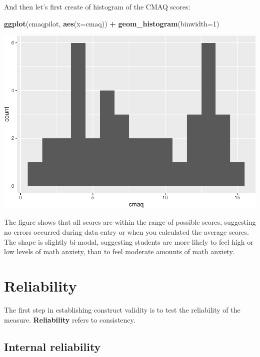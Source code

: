 \documentclass[
]{book}
\newenvironment{Shaded}{\begin{snugshade}}{\end{snugshade}}
\newcommand{\DataTypeTok}[1]{\textcolor[rgb]{0.13,0.29,0.53}{#1}}
\newcommand{\DecValTok}[1]{\textcolor[rgb]{0.00,0.00,0.81}{#1}}
\newcommand{\KeywordTok}[1]{\textcolor[rgb]{0.13,0.29,0.53}{\textbf{#1}}}
\newcommand{\NormalTok}[1]{#1}
\newcommand{\OperatorTok}[1]{\textcolor[rgb]{0.81,0.36,0.00}{\textbf{#1}}}
\newcommand{\StringTok}[1]{\textcolor[rgb]{0.31,0.60,0.02}{#1}}
\begin{document}
And then let's first create of histogram of the CMAQ scores:

\begin{Shaded}
\begin{Highlighting}[]
\KeywordTok{ggplot}\NormalTok{(cmaqpilot, }\KeywordTok{aes}\NormalTok{(}\DataTypeTok{x=}\NormalTok{cmaq)) }\OperatorTok{+}\StringTok{ }
\StringTok{  }\KeywordTok{geom_histogram}\NormalTok{(}\DataTypeTok{binwidth=}\DecValTok{1}\NormalTok{)}
\end{Highlighting}
\end{Shaded}

\includegraphics{Tools-for-working-with-data-211_files/figure-latex/unnamed-chunk-18-1.pdf}

The figure shows that all scores are within the range of possible scores, suggesting no errors occurred during data entry or when you calculated the average scores. The shape is slightly bi-modal, suggesting students are more likely to feel high or low levels of math anxiety, than to feel moderate amounts of math anxiety.

\hypertarget{reliability}{%
\section{Reliability}\label{reliability}}

The first step in establishing construct validity is to test the reliability of the measure. \textbf{Reliability} refers to consistency.

\hypertarget{internal-reliability}{%
\subsection{Internal reliability}\label{internal-reliability}}
\end{document}
